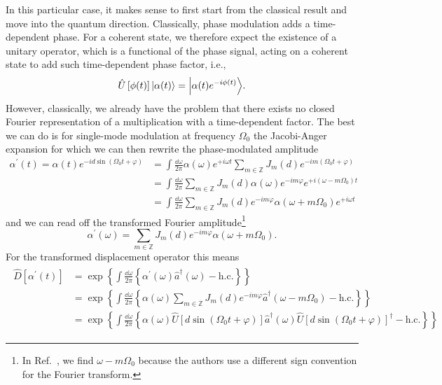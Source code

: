 In this particular case, it makes sense to first start from the classical result and move into the quantum direction.
Classically, phase modulation adds a time-dependent phase.
For a coherent state, we therefore expect the existence of a unitary operator, which is a functional of the phase signal, acting on a coherent state to add such time-dependent phase factor, i.e.,
\begin{equation}
	\hat{U}\left[\phi(t)\right]
	\ket*{\alpha(t)}
	=
	\ket*{\alpha(t)e^{-i\phi(t)}}
	.
\end{equation}
However, classically, we already have the problem that there exists no closed Fourier representation of a multiplication with a time-dependent factor.
The best we can do is for single-mode modulation at frequency $\Omega_0$ the Jacobi-Anger expansion for which we can then rewrite the phase-modulated amplitude
\begin{equation}
	\begin{split}
		\alpha^\prime(t)
		=
		\alpha(t)
		e^{-id\sin(\Omega_0t+\varphi)}
		&=
		\int\frac{\dd{\omega}}{2\pi}
		\alpha(\omega)
		e^{+i\omega t}
		\sum_{m\in\mathbb{Z}}
		J_m(d)
		e^{-im(\Omega_0t+\varphi)}
		\\
		&=
		\int\frac{\dd{\omega}}{2\pi}
		\sum_{m\in\mathbb{Z}}
		J_m(d)
		\alpha(\omega)
		e^{-im\varphi}
		e^{+i(\omega-m\Omega_0)t}
		\\
		&=
		\int\frac{\dd{\omega}}{2\pi}
		\sum_{m\in\mathbb{Z}}
		J_m(d)
		e^{-im\varphi}
		\alpha(\omega+m\Omega_0)
		e^{+i\omega t}
	\end{split}
\end{equation}
and we can read off the transformed Fourier amplitude\footnote{In Ref.~\cite{Horoshko2018}, we find $\omega-m\Omega_0$ because the authors use a different sign convention for the Fourier transform.}
\begin{equation}
	\alpha^\prime(\omega)
	=
	\sum_{m\in\mathbb{Z}}
	J_m(d)
	e^{-im\varphi}
	\alpha(\omega+m\Omega_0)
	.
\end{equation}
For the transformed displacement operator this means
\begin{align}
	\begin{split}
		\hat{D}\left[\alpha^\prime(t)\right]
		&=
		\exp\left\{
			\int\frac{\dd{\omega}}{2\pi}
			\left\{
				\alpha^\prime(\omega)
				\hat{a}^\dagger(\omega)
				-
				\text{h.c.}
			\right\}
		\right\}
		\\
		&=
		\exp\left\{
			\int\frac{\dd{\omega}}{2\pi}
			\left\{
				\alpha(\omega)
				\sum_{m\in\mathbb{Z}}
				J_m(d)
				e^{-im\varphi}
				\hat{a}^\dagger(\omega-m\Omega_0)
				-
				\text{h.c.}
			\right\}
		\right\}
		\\
		&=
		\exp\left\{
			\int\frac{\dd{\omega}}{2\pi}
			\left\{
				\alpha(\omega)
				\hat{U}\left[d\sin(\Omega_0t+\varphi)\right]
				\hat{a}^\dagger(\omega)
				\hat{U}\left[d\sin(\Omega_0t+\varphi)\right]^\dagger
				-
				\text{h.c.}
			\right\}
		\right\}
	\end{split}	
\end{align}
